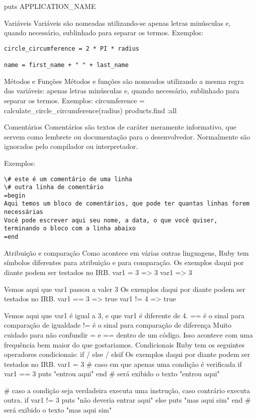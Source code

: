 \documentclass[12pt]{book} %
\begin{document}
puts APPLICATION\_NAME

Variáveis
Variáveis são nomeadas utilizando-se apenas letras minúsculas e, quando necessário, sublinhado para separar os termos.
Exemplos:
\begin{lstlisting}
circle_circumference = 2 * PI * radius

name = first_name + " " + last_name
\end{lstlisting}

Métodos e Funções
Métodos e funções são nomeados utilizando a mesma regra das variáveis: apenas letras minúsculas e, quando necessário, sublinhado para separar os termos.
Exemplos:
circumference = calculate\_circle\_circumference(radius)
products.find :all

Comentários
Comentários são textos de caráter meramente informativo, que servem como lembrete ou documentação para o desenvolvedor. Normalmente são ignorados pelo compilador ou interpretador.

Exemplos:

\begin{lstlisting}
\# este é um comentário de uma linha
\# outra linha de comentário
=begin
Aqui temos um bloco de comentários, que pode ter quantas linhas forem necessárias
Você pode escrever aqui seu nome, a data, o que você quiser, terminando o bloco com a linha abaixo
=end
\end{lstlisting}

Atribuição e comparação
Como acontece em várias outras linguagens, Ruby tem símbolos diferentes para atribuição e para comparação.
Os exemplos daqui por diante podem ser testados no IRB.
var1 = 3
=> 3
var1
=> 3

Vemos aqui que var1 passou a valer 3
Os exemplos daqui por diante podem ser testados no IRB.
var1 == 3
=> true
var1 != 4
=> true

Vemos aqui que var1 é igual a 3, e que var1 é diferente de 4. 
== é o sinal para comparação de igualdade
!= é o sinal para comparação de diferença
Muito cuidado para não confundir = e == dentro de um código. Isso acontece com uma frequência bem maior do que gostariamos.
Condicionais
Ruby tem os seguintes operadores condicionais:
if / else / elsif
Os exemplos daqui por diante podem ser testados no IRB.
var1 = 3
\# caso em que apenas uma condição é verificada
if var1 == 3
  puts "entrou aqui"
end
\# será exibido o texto "entrou aqui"

\# caso a condição seja verdadeira executa uma instrução, caso contrário executa outra. 
if var1 != 3
  puts "não deveria entrar aqui"
else
  puts "mas aqui sim"
end
\# será exibido o texto "mas aqui sim"
\end{document}
